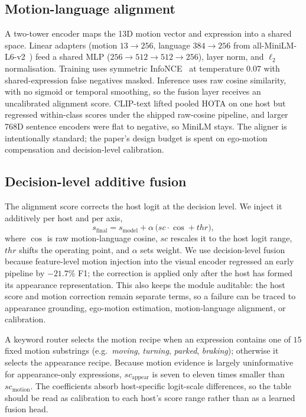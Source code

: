 \documentclass[sigconf,review,anonymous]{acmart}
\begin{document}
\subsection{Motion-language alignment}
\label{sec:align}

A two-tower encoder maps the 13D motion vector and expression into a shared space. Linear adapters (motion $13\!\to\!256$, language $384\!\to\!256$ from all-MiniLM-L6-v2~\cite{sbert}) feed a shared MLP ($256\!\to\!512\!\to\!512\!\to\!256$), layer norm, and $\ell_2$ normalisation. Training uses symmetric InfoNCE~\cite{infonce} at temperature $0.07$ with shared-expression false negatives masked. Inference uses raw cosine similarity, with no sigmoid or temporal smoothing, so the fusion layer receives an uncalibrated alignment score. CLIP-text lifted pooled HOTA on one host but regressed within-class scores under the shipped raw-cosine pipeline, and larger 768D sentence encoders were flat to negative, so MiniLM stays. The aligner is intentionally standard; the paper's design budget is spent on ego-motion compensation and decision-level calibration.

\subsection{Decision-level additive fusion}
\label{sec:fusion}

The alignment score corrects the host logit at the decision level. We inject it additively per host and per axis,
\begin{equation}
s_{\mathrm{final}} = s_{\mathrm{model}} + \alpha\,\bigl(\mathit{sc}\cdot\cos + \mathit{thr}\bigr),
\label{eq:fusion}
\end{equation}
where $\cos$ is raw motion-language cosine, $\mathit{sc}$ rescales it to the host logit range, $\mathit{thr}$ shifts the operating point, and $\alpha$ sets weight. We use decision-level fusion because feature-level motion injection into the visual encoder regressed an early pipeline by $-21.7\%$ F1; the correction is applied only after the host has formed its appearance representation. This also keeps the module auditable: the host score and motion correction remain separate terms, so a failure can be traced to appearance grounding, ego-motion estimation, motion-language alignment, or calibration.

A keyword router selects the motion recipe when an expression contains one of $15$ fixed motion substrings (e.g.\ \emph{moving}, \emph{turning}, \emph{parked}, \emph{braking}); otherwise it selects the appearance recipe. Because motion evidence is largely uninformative for appearance-only expressions, $\mathit{sc}_{\mathrm{appear}}$ is seven to eleven times smaller than $\mathit{sc}_{\mathrm{motion}}$. The coefficients absorb host-specific logit-scale differences, so the table should be read as calibration to each host's score range rather than as a learned fusion head.
\end{document}

